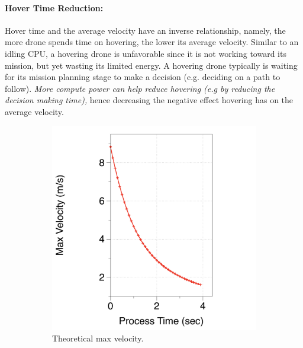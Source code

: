 \paragraph{Hover Time Reduction:} Hover time and the average velocity have an inverse relationship, namely, the more drone spends time on hovering, the lower its average velocity. Similar to an idling CPU, a hovering drone is unfavorable since it is not working toward its mission, but yet wasting its limited energy. A hovering drone typically is waiting for its mission planning stage to make a decision (e.g. deciding on a path to follow). \emph{More compute power can help reduce hovering (e.g by reducing the decision making time),} hence decreasing the negative effect hovering has on the average velocity. 
\begin{figure}[t!]
\centering
    \begin{subfigure}{.49\columnwidth}
    \centering
    \includegraphics[trim=0 0 0 0, clip, width=1.0\columnwidth]{figs/fig_13}
    \caption{Theoretical max velocity.}
    \label{fig:process-time-velocity}
    \end{subfigure}
    \begin{subfigure}{.49\columnwidth}
    \centering

\end{subfigure}
\end{figure}
